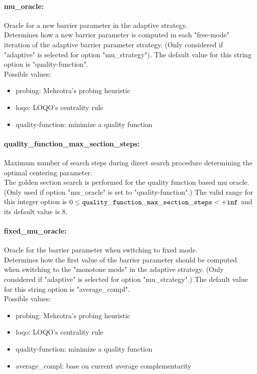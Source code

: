 \paragraph{mu\_oracle:}\label{sec:mu_oracle} Oracle for a new barrier parameter in the adaptive strategy. $\;$ \\
 Determines how a new barrier parameter is
computed in each "free-mode" iteration of the
adaptive barrier parameter strategy. (Only
considered if "adaptive" is selected for option
"mu\_strategy").
The default value for this string option is "quality-function".
\\ 
Possible values:
\begin{itemize}
   \item probing: Mehrotra's probing heuristic
   \item loqo: LOQO's centrality rule
   \item quality-function: minimize a quality function
\end{itemize}

\paragraph{quality\_function\_max\_section\_steps:}\label{sec:quality_function_max_section_steps} Maximum number of search steps during direct search procedure determining the optimal centering parameter. $\;$ \\
 The golden section search is performed for the
quality function based mu oracle. (Only used if
option "mu\_oracle" is set to "quality-function".) The valid range for this integer option is
$0 \le {\tt quality\_function\_max\_section\_steps } <  {\tt +inf}$
and its default value is $8$.


\paragraph{fixed\_mu\_oracle:}\label{sec:fixed_mu_oracle} Oracle for the barrier parameter when switching to fixed mode. $\;$ \\
 Determines how the first value of the barrier
parameter should be computed when switching to
the "monotone mode" in the adaptive strategy.
(Only considered if "adaptive" is selected for
option "mu\_strategy".)
The default value for this string option is "average\_compl".
\\ 
Possible values:
\begin{itemize}
   \item probing: Mehrotra's probing heuristic
   \item loqo: LOQO's centrality rule
   \item quality-function: minimize a quality function
   \item average\_compl: base on current average complementarity
\end{itemize}

